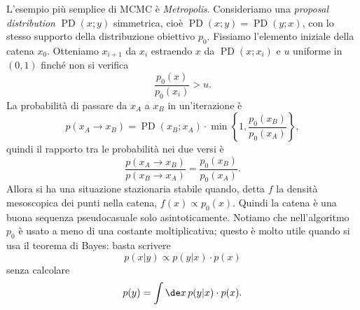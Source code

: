 L'esempio più semplice di MCMC è \emph{Metropolis}.
Consideriamo una \emph{proposal distribution} $\operatorname{PD}(x;y)$ simmetrica,
cioè $\operatorname{PD}(x;y) = \operatorname{PD}(y;x)$,
con lo stesso supporto della distribuzione obiettivo $p_0$.
Fissiamo l'elemento iniziale della catena $x_0$.
Otteniamo $x_{i+1}$ da $x_i$ estraendo $x$ da $\operatorname{PD}(x;x_i)$ e $u$ uniforme in $(0,1)$ finché non si verifica
\begin{equation*}
	\frac{p_0(x)}{p_0(x_i)} > u.
\end{equation*}
La probabilità di passare da $x_A$ a $x_B$ in un'iterazione è
\begin{equation*}
	p(x_A\rightarrow x_B)
	= \operatorname{PD}(x_B;x_A) \cdot \min\left\{1,\frac{p_0(x_B)}{p_0(x_A)}\right\},
\end{equation*}
quindi il rapporto tra le probabilità nei due versi è
\begin{equation*}
	\frac {p(x_A\rightarrow x_B)} {p(x_B\rightarrow x_A)}
	= \frac{p_0(x_B)}{p_0(x_A)}.
\end{equation*}
Allora si ha una situazione stazionaria stabile quando,
detta $f$ la densità mesoscopica dei punti nella catena,
$f(x)\propto p_0(x)$.
Quindi la catena è una buona sequenza pseudocasuale solo asintoticamente.
Notiamo che nell'algoritmo $p_0$ è usato a meno di una costante moltiplicativa;
questo è molto utile quando si usa il teorema di Bayes: basta scrivere
\begin{equation*}
	p(x|y) \propto p(y|x) \cdot p(x)
\end{equation*}
senza calcolare
\begin{equation*}
	p(y) = \int \de x\, p(y|x)\cdot p(x).
\end{equation*}

